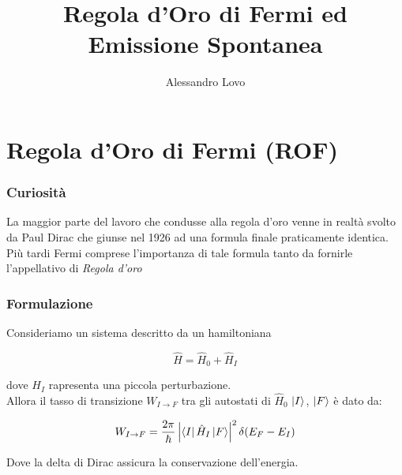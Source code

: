 \documentclass{beamer}
\title[ROF \& ES]{Regola d'Oro di Fermi ed Emissione Spontanea}
\author{Alessandro Lovo}
\begin{document}
\begin{frame}
  \maketitle
\end{frame}

\section{Regola d'Oro di Fermi (ROF)}
\begin{frame}
  \frametitle{Curiosità}
  La maggior parte del lavoro che condusse alla regola d'oro venne in realtà svolto da Paul Dirac che giunse nel 1926 ad una formula finale praticamente identica.
  Più tardi Fermi comprese l'importanza di tale formula tanto da fornirle l'appellativo di \emph{Regola d'oro}

\end{frame}

\begin{frame}
  \frametitle{Formulazione}
  Consideriamo un sistema descritto da un hamiltoniana

  \begin{equation*}
    \hat{H} = \hat{H}_0 + \hat{H}_I
  \end{equation*}

  dove $H_I$ rapresenta una piccola perturbazione.\\
  Allora il tasso di transizione $W_{I \to F}$ tra gli autostati di $\hat{H}_0$ $\ket{I}$, $\ket{F}$ è dato da:

  \begin{equation*}
    W_{I \to F} = \frac{2\pi}{\hbar} \left| \bra{I} \hat{H}_I \ket{F} \right|^2 \delta(E_F - E_I)
  \end{equation*}

  Dove la delta di Dirac assicura la conservazione dell'energia.
\end{frame}
\end{document}
